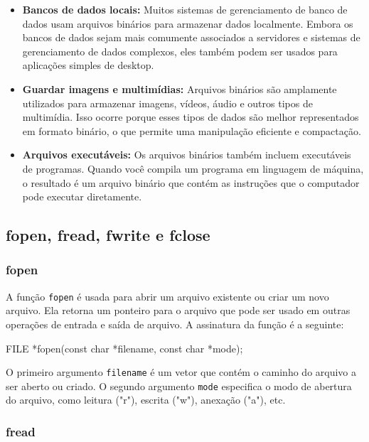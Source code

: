 \begin{itemize}
        \renewcommand{\labelitemi}{\tiny$\blacksquare$}
    \item \textbf{Bancos de dados locais:} Muitos sistemas de gerenciamento de 
        banco de dados usam arquivos binários para armazenar dados localmente. 
        Embora os bancos de dados sejam mais comumente associados a servidores 
        e sistemas de gerenciamento de dados complexos, eles também podem ser 
        usados para aplicações simples de desktop.
    \item \textbf{Guardar imagens e multimídias:} Arquivos binários são 
        amplamente utilizados para armazenar imagens, vídeos, áudio e outros 
        tipos de multimídia. Isso ocorre porque esses tipos de dados são melhor 
        representados em formato binário, o que permite uma manipulação 
        eficiente e compactação.
    \item \textbf{Arquivos executáveis:} Os arquivos binários também incluem 
        executáveis de programas. Quando você compila um programa em linguagem 
        de máquina, o resultado é um arquivo binário que contém as instruções 
        que o computador pode executar diretamente.
\end{itemize}

\subsection{fopen, fread, fwrite e fclose}

\subsubsection{fopen}

A função \texttt{fopen} é usada para abrir um arquivo existente ou criar um 
novo arquivo. Ela retorna um ponteiro para o arquivo que pode ser usado em 
outras operações de entrada e saída de arquivo. A assinatura da função é a 
seguinte:

\begin{excode}
    FILE *fopen(const char *filename, const char *mode);
\end{excode}

O primeiro argumento \texttt{filename} é um vetor que contém o caminho do 
arquivo a ser aberto ou criado. O segundo argumento \texttt{mode} especifica o 
modo de abertura do arquivo, como leitura ("r"), escrita ("w"), anexação ("a"), 
etc.

\subsubsection{fread}

